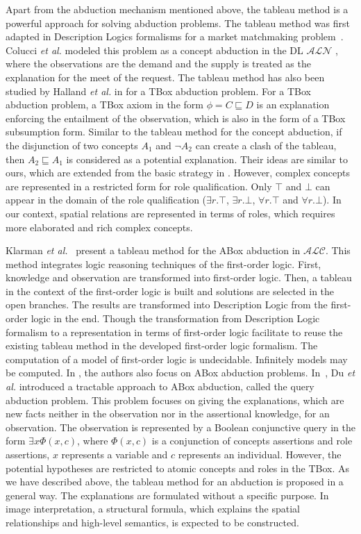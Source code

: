 \documentclass{article}
\begin{document}
Apart from the abduction mechanism mentioned above, the tableau method is a powerful approach for solving abduction problems.
The tableau method was first adapted in Description Logics formalisms for a market matchmaking problem~\cite{colucci2004uniform}.
Colucci \textit{et al.} modeled this problem as a concept abduction in the DL $\mathcal{ALN}$ \cite{colucci2004uniform},
where the observations are the demand and the supply is treated as the explanation for the meet of the request.
The tableau method has also been studied by Halland \textit{et al.} in \cite{halland2014tbox} for a TBox abduction problem.
For a TBox abduction problem, a TBox axiom in the form $\phi= C\sqsubseteq D$ is an explanation enforcing the entailment of the observation,
which is also in the form of  a TBox subsumption form. Similar to the tableau method for the  concept abduction, if the disjunction of
two concepts $A_1$  and $\neg A_2$ can create a clash of the tableau, then $A_2 \sqsubseteq A_1$ is considered as a potential explanation.
Their ideas are similar to ours, which are extended from the basic strategy in \cite{aliseda1997seeking,colucci2004uniform}.
However, complex concepts are represented in a restricted form for role qualification. Only $\top$ and $\bot$ can  appear in the domain
of the role qualification ($\exists r.\top$, $\exists r.\bot$, $\forall r.\top$ and $\forall r.\bot$). In our context, spatial relations
are represented in terms of roles, which requires more elaborated and rich complex concepts.

Klarman \textit{et al.}~\cite{klarman2011abox} present a tableau method for the ABox abduction in $\mathcal{ALC}$.
This method integrates logic reasoning techniques of the first-order logic. First, knowledge and observation are
transformed into first-order logic. Then, a tableau in the context of the first-order logic is built and solutions
are selected in the open branches. The results are transformed into Description Logic from the first-order logic in the end.
Though the transformation from Description Logic formalism to a representation in terms of first-order logic facilitate to reuse the existing tableau method
in the developed first-order logic formalism.
The computation of a model of first-order logic is undecidable. Infinitely models may be computed.
In \cite{du2011towards,du2014tractable}, the authors also focus on ABox abduction problems. 
In~\cite{du2014tractable}, Du \textit{et al.} introduced a tractable approach to ABox abduction, called the query abduction problem.
This problem focuses on giving the explanations, which are new facts neither in the observation nor in the assertional knowledge, for an observation.
The observation is represented by a Boolean conjunctive query in the form $\exists x\Phi(x,c)$, where $\Phi(x,c)$ is a conjunction of concepts
assertions and role assertions, $x$ represents a variable and $c$ represents an individual.
However, the potential hypotheses are restricted to atomic concepts and roles in the TBox.
As we have described above, the tableau method for an abduction is proposed in a general way.
The explanations are formulated without a specific purpose.
In image interpretation, a structural formula, which explains the spatial relationships and high-level semantics, is expected to be constructed. 
\end{document}
